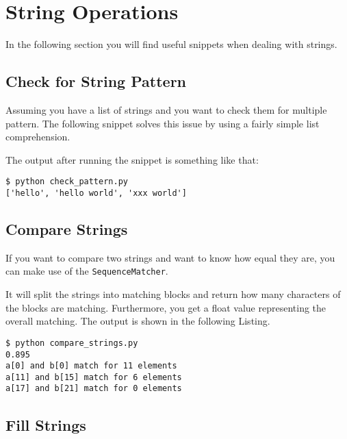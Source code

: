
\section{String Operations}

In the following section you will find useful snippets when dealing with strings.


\subsection{Check for String Pattern}

Assuming you have a list of strings and you want to check them for multiple pattern.
The following snippet solves this issue by using a fairly simple list comprehension.



The output after running the snippet is something like that:

\begin{lstlisting}[caption=Output of check\_pattern.py]
$ python check_pattern.py
['hello', 'hello world', 'xxx world']
\end{lstlisting}


\subsection{Compare Strings}

If you want to compare two strings and want to know \glqq how equal they are\grqq, you can make use of the \linebreak \lstinline{SequenceMatcher}.



It will split the strings into matching blocks and return how many characters of the blocks are matching.
Furthermore, you get a float value representing the overall matching.
The output is shown in the following Listing.

\begin{lstlisting}[caption=Output of compare\_strings.py]
$ python compare_strings.py
0.895
a[0] and b[0] match for 11 elements
a[11] and b[15] match for 6 elements
a[17] and b[21] match for 0 elements
\end{lstlisting}


\subsection{Fill Strings}

